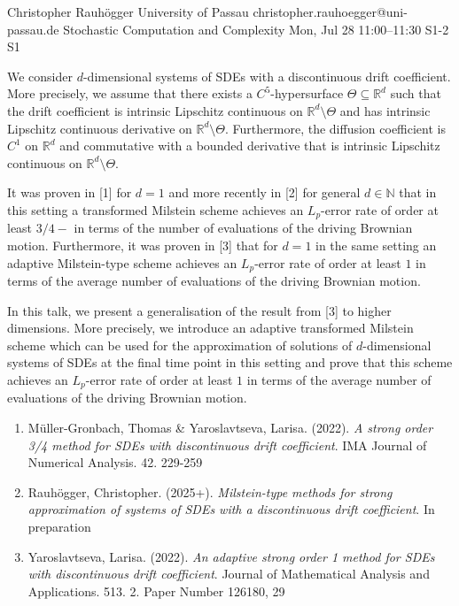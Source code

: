 \begin{talk}
  {Christopher Rauh\"ogger}%
  {University of Passau}%
  {christopher.rauhoegger@uni-passau.de}%
  {Stochastic Computation and Complexity}%
  {}%
  {}%
  {Mon, Jul 28 11:00--11:30}%
  {S1-2}%
  {S1}%
    
   
We consider $d$-dimensional systems of SDEs with a discontinuous drift coefficient. More precisely,
we assume that there exists a $C^{5}$-hypersurface
$\Theta\subseteq \mathbb{R}^{d}$ such that the drift coefficient is intrinsic Lipschitz continuous on $\mathbb{R}^{d}\setminus \Theta$ and has intrinsic Lipschitz continuous derivative on $\mathbb{R}^{d}\setminus \Theta$.
Furthermore, the diffusion coefficient is $C^{1}$ on $\mathbb{R}^{d}$ and commutative with a bounded derivative that is intrinsic Lipschitz continuous on $\mathbb{R}^{d}\setminus \Theta$.

It was proven in [1] for $d = 1$ and more recently in [2] for general $d \in \mathbb{N}$ that in this setting a transformed Milstein scheme achieves an $L_{p}$-error rate of order at least $3/4-$ in terms of the number of evaluations of the
driving Brownian motion.
Furthermore, it was proven in [3] that for $d = 1$ in the same setting an adaptive Milstein-type scheme achieves an $L_{p}$-error rate of order at least $1$ in terms of the average number of evaluations of the driving Brownian motion. 

In this talk, we present a generalisation of the result from [3] to higher dimensions. More precisely, we introduce an adaptive transformed Milstein scheme which can be used for the approximation of solutions of $d$-dimensional systems of SDEs at the final time point in this setting and
prove that this scheme achieves an $L_{p}$-error rate of order at least $1$ in terms of the average number of evaluations of the
driving Brownian motion.

\medskip

\begin{enumerate}
 \item[{[1]}] M\"{u}ller-Gronbach, Thomas \& Yaroslavtseva, Larisa. (2022). {\it A strong order 3/4 method for {SDE}s with discontinuous drift
  coefficient}. IMA Journal of Numerical Analysis. 42. 229-259
 \item[{[2]}] Rauh\"ogger, Christopher. (2025+). {\it Milstein-type methods for strong approximation of systems of SDEs with a discontinuous drift coefficient}. In preparation
 \item[{[3]}] Yaroslavtseva, Larisa. (2022). {\it An adaptive strong order 1 method for {SDE}s with
  discontinuous drift coefficient}. Journal of Mathematical Analysis and Applications. 513. 2. Paper Number 126180, 29
\end{enumerate}

\end{talk}

